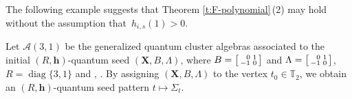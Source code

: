 \documentclass[10pt,a4paper]{amsart}
\numberwithin{equation}{section}
\begin{document}
The following example suggests that Theorem \ref{t:F-polynomial}\,(2) may hold without the assumption that~${h_{i,s}(1)>0}$.
\begin{Example}[type $G_{2}$]
Let $\mathcal{A}(3,1)$ be the generalized quantum cluster algebras associated to the initial $(R,\mathbf{h})$-quantum seed $(\mathbf{X},B,\Lambda)$, where
$B=\left[\begin{smallmatrix}
 \hphantom{-}0&1\\
 -1&0
\end{smallmatrix}\right]$ and $\Lambda=\left[\begin{smallmatrix}
 \hphantom{-}0&1\\
 -1&0
\end{smallmatrix}\right]$, $R=\operatorname{diag}\{3,1\}$ and ,
. By assigning $(\mathbf{X}, B,\Lambda)$ to the vertex $t_0\in \mathbb{T}_2$, we obtain an $(R,\mathbf{h})$-quantum seed pattern $t\mapsto \Sigma_t$.


\end{Example}
\end{document}
